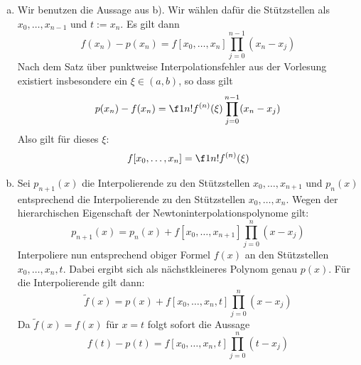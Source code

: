 \documentclass[a4paper]{scrartcl}
\begin{document}
\begin{aufgabe}
	\begin{enumerate}[a)]
		\item 
			Wir benutzen die Aussage aus b).
			Wir wählen dafür die Stützstellen als $x_0,\dotsc,x_{n-1}$ und $t:=x_n$.
			Es gilt dann
			\[
				f(x_n) - p(x_n) = f[x_0,\dotsc,x_n] \prod_{j=0}^{n-1} (x_n-x_j)
			\]
			Nach dem Satz über punktweise Interpolationsfehler aus der Vorlesung existiert insbesondere ein $\xi\in (a,b)$, so dass gilt
			\[
				p(x_n) - f(x_n) = \f 1{n!} f^{(n)}(\xi) \prod_{j=0}^{n-1} (x_n-x_j)
			\]
			Also gilt für dieses $\xi$:
			\[
				f[x_0,\dotsc,x_n] = \f 1{n!} f^{(n)}(\xi)
			\]
		\item
			Sei $p_{n+1}(x)$ die Interpolierende zu den Stützstellen $x_0,\dotsc,x_{n+1}$ und $p_{n}(x)$ entsprechend die Interpolierende zu den Stützstellen $x_0,\dotsc,x_n$.
			Wegen der hierarchischen Eigenschaft der Newtoninterpolationspolynome gilt:
			\[
				p_{n+1}(x) = p_n(x) + f[x_0,\dotsc,x_{n+1}]\prod_{j=0}^n (x-x_j)
			\]
			Interpoliere nun entsprechend obiger Formel $f(x)$ an den Stützstellen $x_0,\dotsc,x_n,t$.
			Dabei ergibt sich als nächstkleineres Polynom genau $p(x)$.
			Für die Interpolierende gilt dann:
			\[
				\tilde f(x) = p(x) + f[x_0,\dotsc,x_n,t]\prod_{j=0}^n (x-x_j)
			\]
			Da $\tilde f(x) = f(x)$ für $x=t$ folgt sofort die Aussage
			\[
				f(t) - p(t) = f[x_0,\dotsc,x_n,t] \prod_{j=0}^n (t-x_j)
			\]
	\end{enumerate}
\end{aufgabe}

\newpage
	\lstset{basicstyle=\scriptsize}
\setcounter{aufgabe}{3}
\end{document}
